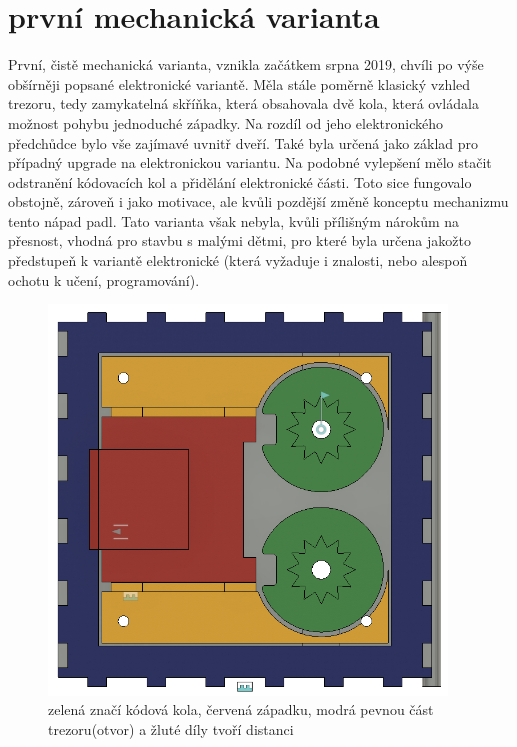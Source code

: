 \section*{první mechanická varianta}
První, čistě mechanická varianta, vznikla začátkem srpna 2019, chvíli po výše obšírněji popsané elektronické variantě.
Měla stále poměrně klasický vzhled trezoru, tedy zamykatelná skříňka, která obsahovala dvě kola, která ovládala možnost pohybu jednoduché západky.
Na rozdíl od jeho elektronického předchůdce bylo vše zajímavé uvnitř dveří. Také byla určená jako základ pro případný upgrade na elektronickou
variantu. Na podobné vylepšení mělo stačit odstranění kódovacích kol a přidělání elektronické části. Toto sice fungovalo obstojně, zároveň 
i jako motivace, ale kvůli pozdější změně konceptu mechanizmu tento nápad padl.
Tato varianta však nebyla, kvůli přílišným nárokům na přesnost, vhodná pro stavbu s malými dětmi, pro které byla určena jakožto předstupeň 
k variantě elektronické (která vyžaduje i znalosti, nebo alespoň ochotu k učení, programování).

\begin{figure}[htbp]
    \centering
    \includegraphics[width=400]{kapitoly/obrazky/M1-mechanizmus.png}
    \caption{zelená značí kódová kola, červená západku, modrá pevnou část trezoru(otvor) a žluté díly tvoří distanci}
    \label{fig:M1}
\end{figure}
\newpage